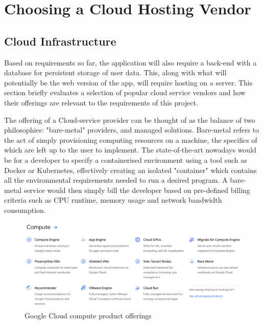 \section{Choosing a Cloud Hosting Vendor}
\subsection{Cloud Infrastructure}
Based on requirements so far, the application will also require a back-end with a database for persistent storage of user data. This, along with what will potentially be the web version of the app, will require hosting on a server. This section briefly evaluates a selection of popular cloud service vendors and how their offerings are relevant to the requirements of this project.

The offering of a Cloud-service provider can be thought of as the balance of two philosophies: "bare-metal" providers, and managed solutions. Bare-metal refers to the act of simply provisioning computing resources on a machine, the specifics of which are left up to the user to implement. The state-of-the-art nowadays would be for a developer to specify a containerised environment using a tool such as Docker or Kubernetes, effectively creating an isolated "container" which contains all the environmental requirements needed to run a desired program. A bare-metal service would then simply bill the developer based on pre-defined billing criteria such as CPU runtime, memory usage and network bandwidth consumption.

\begin{figure}[h]
    \begin{center}
        \includegraphics[scale=0.4]{images/google_cloud_compute_offerings.png}
    \end{center}
    \caption{Google Cloud compute product offerings}
    \label{gcp_compute_offerings}
\end{figure}

